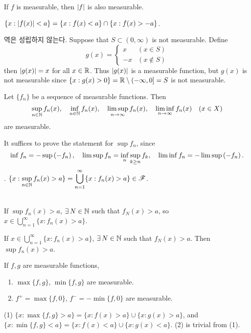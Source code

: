  If \(f\) is measurable, then \(\left| f \right|\) is also measurable.

\pf \(\{x : \left| f(x) \right| < a\} = \{x : f(x) < a\} \cap \{x : f(x) > -a\}\).

\rmk 역은 성립하지 않는다. Suppose that \(S \subset (0, \infty)\) is not measurable. Define
\[
    g(x) = \begin{cases}
        x & (x \in S) \\ -x & (x \notin S)
    \end{cases}
\]
then \(\left| g(x) \right| = x\) for all \(x \in \mathbb{R}\). Thus \(\left| g(x) \right|\) is a measurable function, but \(g(x)\) is not measurable since \(\{x : g(x) > 0\} = \mathbb{R} \setminus (-\infty, 0] = S\) is not measurable.

\medskip

 Let \(\{f_n\}\) be a sequence of measurable functions. Then
\[
    \sup_{n\in \mathbb{N}} f_n(x), \quad \inf_{n\in \mathbb{N}} f_n(x), \quad \limsup_{n \rightarrow \infty} f_n(x), \quad \liminf_{n \rightarrow \infty} f_n(x) \quad (x\in X)
\]
are measurable.

\pf It suffices to prove the statement for \(\sup f_n\), since
\[
    \inf f_n = -\sup\left( -f_n \right), \quad \limsup f_n = \inf_n \sup_{k\geq n} f_k, \quad \liminf f_n = -\limsup\left( -f_n \right).
\]
\quad \claim. \(\displaystyle \{x : \sup_{n\in\mathbb{N}} f_n(x) > a\} =  \bigcup_{n=1}^{\infty} \{x : f_n(x) > a\} \in \mathscr{F}\).

\quad \pf \\
\note{\(\subset\)} If \(\sup f_n(x) > a\), \(\exists N \in \N\) such that \(f_N(x) > a\), so \(x \in \bigcup_{n=1}^{\infty} \{x : f_n(x) > a\}\).

\note{\(\supseteq\)} If \(x \in \bigcup_{n=1}^{\infty} \{x : f_n(x) > a\}\), \(\exists N \in \N\) such that \(f_N(x) > a\). Then \(\sup f_n(x) > a\).

\medskip

\cor If \(f, g\) are measurable functions,
\begin{enumerate}
    \item \(\max\{f, g\}\), \(\min\{f, g\}\) are measurable.
    \item \(f^+ = \max\{f, 0\}\), \(f^- = -\min\{f, 0\}\) are measurable.
\end{enumerate}

\pf (1) \(\{x : \max\{f, g\} > a\} = \{x : f(x) > a\} \cup \{x : g(x) > a\}\), and \(\{x : \min\{f, g\} < a\} = \{x : f(x) < a\} \cup \{x : g(x) < a\}\). (2) is trivial from (1).

\medskip

